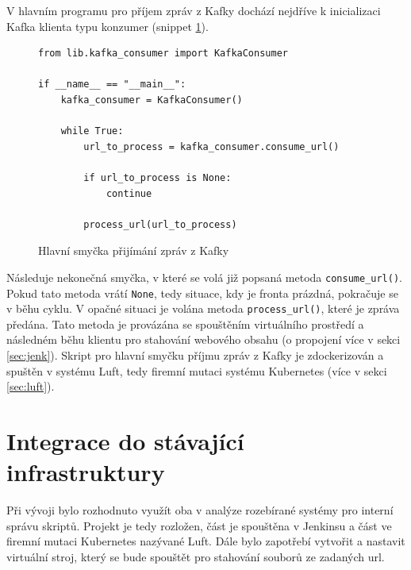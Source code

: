\documentclass[thesis=M,czech,hidelinks]{FITthesis}[2013/05/06]
\begin{document}
V hlavním programu pro příjem zpráv z Kafky dochází nejdříve k inicializaci Kafka klienta typu konzumer (snippet \ref{snip:kafkamain consum}).
\begin{figure}[h]               
	\begin{verbatim}
from lib.kafka_consumer import KafkaConsumer

if __name__ == "__main__":
    kafka_consumer = KafkaConsumer()
    
    while True:
        url_to_process = kafka_consumer.consume_url()

        if url_to_process is None:
            continue
        
        process_url(url_to_process)
	\end{verbatim}      
	\caption{Hlavní smyčka přijímání zpráv z Kafky}
	\label{snip:kafkamain consum}
\end{figure}
Následuje nekonečná smyčka, v které se volá již popsaná metoda \texttt{consume_url()}. Pokud tato metoda vrátí \texttt{None}, tedy situace, kdy je fronta prázdná, pokračuje se v běhu cyklu. V opačné situaci je volána metoda \texttt{process_url()}, které je zpráva předána. Tato metoda je provázána se spouštěním virtuálního prostředí a následném běhu klientu pro stahování webového obsahu (o propojení více v sekci \ref{sec:jenk}).  Skript pro hlavní smyčku příjmu zpráv z Kafky je zdockerizován a spuštěn v systému Luft, tedy firemní mutaci systému Kubernetes (více v sekci \ref{sec:luft}). 





\section{Integrace do stávající infrastruktury} \label{sec:integrace}
Při vývoji bylo rozhodnuto využít oba v analýze rozebírané systémy pro interní správu skriptů. Projekt je tedy rozložen, část je spouštěna v Jenkinsu a část ve firemní mutaci Kubernetes nazývané Luft. Dále bylo zapotřebí vytvořit a nastavit virtuální stroj, který se bude spouštět pro stahování souborů ze zadaných url.
\end{document}
